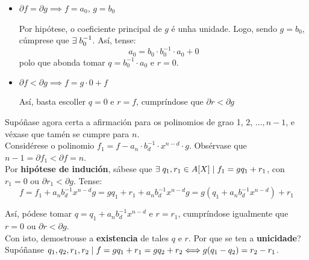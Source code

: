 \documentclass[twoside]{report}
\theoremstyle{mystyle}
\begin{document}
\begin{itemize}
    \item $\partial f = \partial g \implies f = a_{0}$, $g = b_{0}$
    
    Por hipótese, o coeficiente principal de $g$ é unha unidade. Logo, sendo $g = b_{0}$, cúmprese que $\exists \hspace{1mm} b_{0}^{-1}$. Así, tense:
    $$a_{0} = b_{0} \cdot b_{0}^{-1} \cdot a_{0} + 0$$
    polo que abonda tomar $q = b_{0}^{-1} \cdot a_{0}$ e $r = 0$.
    
    \item $\partial f < \partial g \implies f = g \cdot 0 + f$
    
    Así, basta escoller $q = 0$ e $r = f$, cumpríndose que $\partial r < \partial g$
    
\end{itemize}

\noindent Supóñase agora certa a afirmación para os polinomios de grao 1, 2, $\ldots, n-1$, e véxase que tamén se cumpre para $n$.\\

\noindent Considérese o polinomio $f_{1} = f - a_{n} \cdot b_{d}^{-1} \cdot x^{n-d} \cdot g$. Obsérvase que $n-1 = \partial f_{1} < \partial f = n$.\\

\noindent Por \textbf{hipótese de indución}, sábese que $\exists \hspace{1mm} q_{1}, r_{1} \in A[X] \hspace{1mm} | \hspace{1mm} f_{1} = gq_{1} + r_{1}$, con $r_{1} = 0$ ou $\partial r_{1} < \partial g$. Tense:
$$f = f_{1} + a_{n}b_{d}^{-1}x^{n-d}g = gq_{1} + r_{1} + a_{n}b_{d}^{-1}x^{n-d}g = g(q_{1} + a_{n}b_{d}^{-1}x^{n-d}) + r_{1}$$

\noindent Así, pódese tomar $q = q_{1} + a_{n}b_{d}^{-1}x^{n-d}$ e $r = r_{1}$, cumpríndose igualmente que $r = 0$ ou $\partial r < \partial g$.\\

\noindent Con isto, demostrouse a \textbf{existencia} de tales $q$ e $r$. Por que se ten a \textbf{unicidade}?\\

\noindent Supóñanse $q_{1}, q_{2}, r_{1}, r_{2} \hspace{1mm} | \hspace{1mm} f = gq_{1} + r_{1} = gq_{2} + r_{2} \Longleftrightarrow g(q_{1} - q_{2}) = r_{2} - r_{1}$. \\
\end{document}

